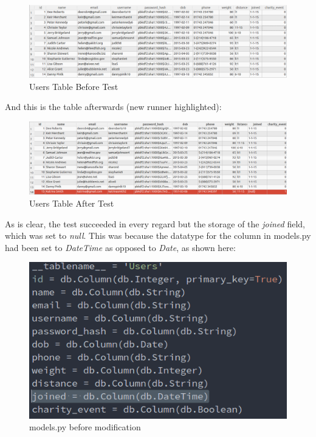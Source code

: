 \documentclass{article}[12pt,a4paper]
\begin{document}
\begin{figure}[h!]
  \includegraphics[scale=0.35]{images/testing/add_user/database_before}
  \caption{Users Table Before Test}
\end{figure}

And this is the table afterwards (new runner highlighted):

\begin{figure}[h!]
  \includegraphics[scale=0.34]{images/testing/add_user/database_after_broken}
  \caption{Users Table After Test}
\end{figure}

\clearpage

As is clear, the test succeeded in every regard but the storage of the \textit{joined} field, which was set to \textit{null}. This was because the datatype for the column in models.py had been set to \textit{DateTime} as opposed to \textit{Date}, as shown here:

\begin{figure}[h!]
    \includegraphics[scale=0.5]{images/testing/add_user/code_before}
    \caption{models.py before modification}
\end{figure}
\end{document}
